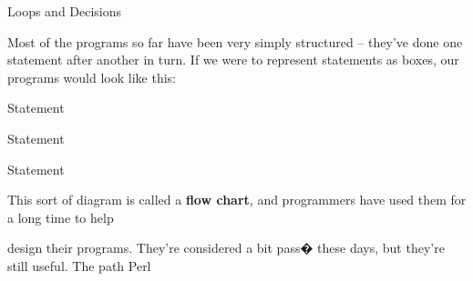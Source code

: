 \documentclass[a4paper,11pt]{book}
\begin{document}

\noindent 

\noindent 

\noindent 

\noindent 

\noindent 

\noindent 

\noindent 

\noindent 

\noindent 

\noindent 

\noindent 

\noindent 

\noindent 

\noindent 

\noindent 

\noindent Loops and Decisions

\noindent 

\noindent 

\noindent 

\noindent 

\noindent Most of the programs so far have been very simply structured -- they've done one statement after another in turn. If we were to represent statements as boxes, our programs would look like this:

\noindent 

\noindent 

\noindent Statement

\noindent 

\noindent 

\noindent 

\noindent 

\noindent Statement

\noindent 

\noindent 

\noindent 

\noindent 

\noindent Statement

\noindent 

\noindent 

\noindent 

\noindent 

\noindent 

\noindent This sort of diagram is called a \textbf{flow chart}, and programmers have used them for a long time to help

\noindent design their programs. They're considered a bit pass� these days, but they're still useful. The path Perl
\end{document}
